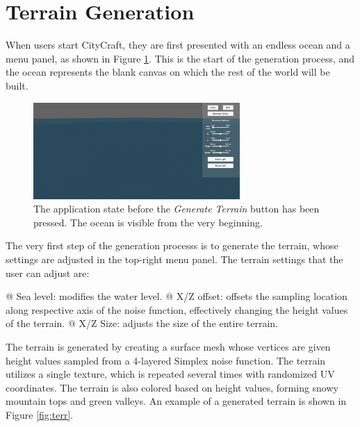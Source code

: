 \section{Terrain Generation}

When users start CityCraft, they are first presented with an endless ocean and a menu panel, as shown in Figure \ref{fig:no_terr}.
This is the start of the generation process, and the ocean represents the blank canvas on which the rest of the world will be built.

\begin{figure}[H]
  \centering

  \includegraphics[width=0.7\textwidth]{figure/terrain_not_generated.png}
  \caption{The application state before the \textit{Generate Terrain} button has been pressed. The ocean is visible from the very beginning.}

  \label{fig:no_terr}
\end{figure}

The very first step of the generation processs is to generate the terrain, whose settings are adjusted in the top-right menu panel.
The terrain settings that the user can adjust are:
\begin{easylist}
  @ Sea level: modifies the water level.
  @ X/Z offset: offsets the sampling location along respective axis of the noise function, effectively changing the height values of the terrain.
  @ X/Z Size: adjusts the size of the entire terrain.
\end{easylist}

The terrain is generated by creating a surface mesh whose vertices are given height values sampled from a 4-layered Simplex noise function.
The terrain utilizes a single texture, which is repeated several times with randomized UV coordinates.
The terrain is also colored based on height values, forming snowy mountain tops and green valleys.
An example of a generated terrain is shown in Figure \ref{fig:terr}.

